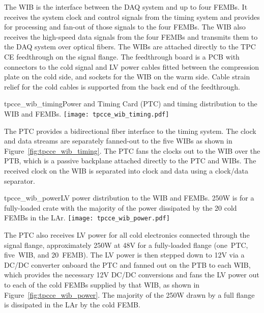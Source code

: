 The WIB is the interface between the
DAQ system and up to four
FEMBs. It receives the system clock and control signals from the
timing system and provides for processing and fan-out of those signals to the four
FEMBs. The WIB also receives the high-speed data signals from the four 
FEMBs and transmits them to the DAQ system over optical
fibers.  The WIBs are attached directly to the TPC
CE feedthrough on the signal flange. The feedthrough
board is a PCB with connectors to the cold signal and LV power cables fitted
between the compression plate on the cold side, and sockets for
the WIB on the warm side. Cable strain relief for the cold cables is 
supported from the back end of the feedthrough.



\begin{cdrfigure}{tpcce_wib_timing}{Power and Timing Card (PTC) 
and timing distribution to the WIB and FEMBs.}
\texttt{[image: tpcce\_wib\_timing.pdf]}
\end{cdrfigure}

The PTC provides a bidirectional fiber interface to the
timing system.  The clock and data
streams are separately fanned-out to the five WIBs as shown in
Figure~\ref{fig:tpcce_wib_timing}. The PTC fans the clocks out to the WIB over the
PTB, which is a passive backplane attached directly to the PTC and
WIBs.  The received clock on the WIB is separated into clock and
data using a clock/data separator.

\begin{cdrfigure}{tpcce_wib_power}{LV power distribution 
to the WIB and FEMBs. 250W is for a fully-loaded crate 
with the majority of the power dissipated by the 20 cold FEMBs in the LAr.}
\texttt{[image: tpcce\_wib\_power.pdf]} %
\end{cdrfigure}

The PTC also receives LV power for all cold
electronics connected through the signal flange, approximately 250W at 48V for a
fully-loaded flange (one~PTC, five~WIB, and 20~FEMB). The LV power is then stepped down
to 12V via a DC/DC converter onboard the PTC and fanned out
on the PTB to each WIB, which provides the necessary 12V DC/DC conversions and fans
the LV power out to each of the cold FEMBs supplied by that WIB, 
as shown in Figure~\ref{fig:tpcce_wib_power}. The 
majority of the 250W drawn by a full flange is dissipated in the LAr
by the cold FEMB.


